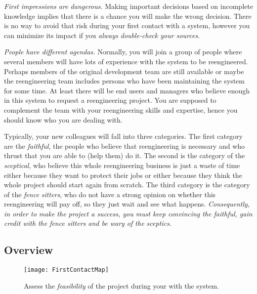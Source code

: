 \documentclass[a4paper,10pt,twoside]{book}
\begin{document}
\begin{bulletlist}
  \item \emph{First impressions are dangerous.}
Making important decisions based on incomplete knowledge implies that there is a chance you will make the wrong decision. There is no way to avoid that risk during your first contact with a system, however you can minimize its impact if you \emph{always double-check your sources}.

  \item \emph{People have different agendas.}
Normally, you will join a group of people where several members will have lots of experience with the system to be reengineered. Perhaps members of the original development team are still available or maybe the reengineering team includes persons who have been maintaining the system for some time. At least there will be end users and managers who believe enough in this system to request a reengineering project. You are supposed to complement the team with your reengineering skills and expertise, hence you should know who you are dealing with. 

Typically, your new colleagues will fall into three categories. The first category are the \emph{faithful}, the people who believe that reengineering is necessary and who thrust that you are able to (help them) do it. The second is the category of the \emph{sceptical}, who believe this whole reengineering business is just a waste of time either because they want to protect their jobs or either because they think the whole project should start again from scratch. The third category is the category of the \emph{fence sitters}, who do not have a strong opinion on whether this reengineering will pay off, so they just wait and see what happens. \emph{Consequently, in order to make the project a success, you must keep convincing the faithful, gain credit with the fence sitters and be wary of the sceptics.}

\end{bulletlist}

\subsection*{Overview}

\begin{figure}
\begin{center}
\texttt{[image: FirstContactMap]}
\caption{Assess the \emph{feasibility} of the project during your  with the system.}
\end{center}
\end{figure}
\end{document}
